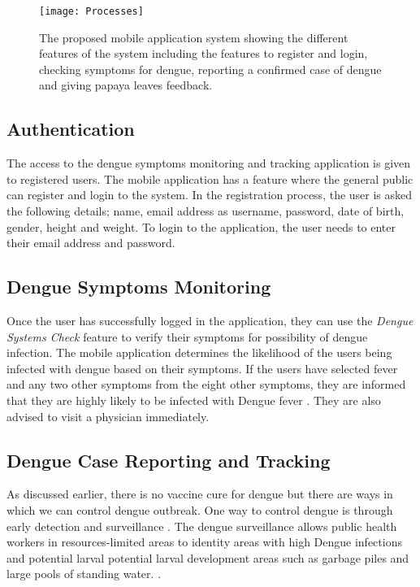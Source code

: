 \documentclass[runningheads,a4paper]{llncs}
\begin{document}
\begin{figure}[htb!]
    \begin{center}
    \texttt{[image: Processes]}
    \caption{The proposed mobile application system showing the different features of the system including the features to register and login, checking symptoms for dengue, reporting a confirmed case of dengue and giving papaya leaves feedback. }
  \end{center}
\end{figure}


\subsection{Authentication}
The access to the dengue symptoms monitoring and tracking application is given to registered users. The mobile application has a feature where the general public can register and login to the system. In the registration process, the user is asked the following details; name, email address as username, password, date of birth, gender, height and weight. To login to the application, the user needs to enter their email address and password.

\subsection{Dengue Symptoms Monitoring}
Once the user has successfully logged in the application, they can use the \textit{ Dengue Systems Check} feature to verify their symptoms for possibility of dengue infection. The mobile application determines the likelihood of the users being infected with dengue based on their symptoms. If the users have selected fever and any two other symptoms from the eight other symptoms, they are informed that they are highly likely to be infected with Dengue fever \cite{WHO2009}. They are also advised to visit a physician immediately.

\subsection{Dengue Case Reporting and Tracking}
As discussed earlier, there is no vaccine cure for dengue but there are ways in which we can control dengue outbreak. One way to control dengue is through early detection and surveillance \cite{Muller201290} \cite{Cleton2014159}. The dengue surveillance allows public health workers in resources-limited areas to identity areas with high Dengue infections and potential larval potential larval development areas such as garbage piles and large pools of standing water. \cite{Chang2009}. 
\end{document}
